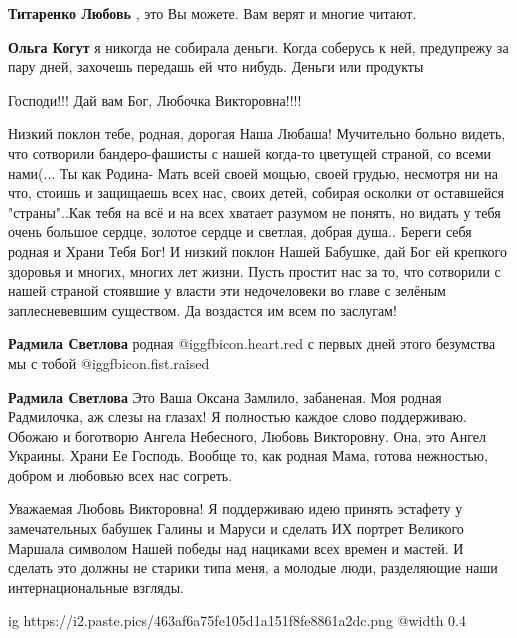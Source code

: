 \begin{itemize}
\begin{itemize}
\textbf{Титаренко Любовь} , это Вы можете. Вам верят и многие читают.

\textbf{Ольга Когут} я никогда не собирала деньги. Когда соберусь к ней, предупрежу за пару дней, захочешь передашь ей что нибудь. Деньги или продукты

Господи!!! Дай вам Бог, Любочка Викторовна!!!!
\end{itemize} %


Низкий поклон тебе, родная, дорогая Наша Любаша! Мучительно больно видеть, что
сотворили бандеро-фашисты с нашей когда-то цветущей страной, со всеми
нами(... Ты как Родина- Мать всей своей мощью, своей грудью, несмотря ни на
что, стоишь и защищаешь всех нас, своих детей, собирая осколки от оставшейся
"страны"..Как тебя на всё и на всех хватает разумом не понять, но видать у тебя
очень большое сердце, золотое сердце и светлая, добрая душа.. Береги себя
родная и Храни Тебя Бог! И низкий поклон Нашей Бабушке, дай Бог ей крепкого
здоровья и многих, многих лет жизни. Пусть простит нас за то, что сотворили с
нашей страной стоявшие у власти эти недочеловеки во главе с зелёным
заплесневевшим существом. Да воздастся им всем по заслугам!

\begin{itemize} %
\textbf{Радмила Светлова} родная @igg{fbicon.heart.red} с первых дней этого безумства мы с тобой @igg{fbicon.fist.raised} 

\textbf{Радмила Светлова} Это Ваша Оксана Замлило, забаненая. Моя родная Радмилочка, аж слезы на глазах! Я полностью каждое слово поддерживаю. Обожаю и боготворю Ангела Небесного, Любовь Викторовну. Она, это Ангел Украины. Храни Ее Господь. Вообще то, как родная Мама, готова нежностью, добром и любовью всех нас согреть.
\end{itemize} %


Уважаемая Любовь Викторовна! Я поддерживаю идею принять эстафету у
замечательных бабушек Галины и Маруси и сделать ИХ портрет Великого Маршала
символом Нашей победы над нациками всех времен и мастей. И сделать это должны
не старики типа меня, а молодые люди, разделяющие наши интернациональные
взгляды.



\ifcmt
  ig https://i2.paste.pics/463af6a75fe105d1a151f8fe8861a2dc.png
  @width 0.4
\fi


\end{itemize} %
